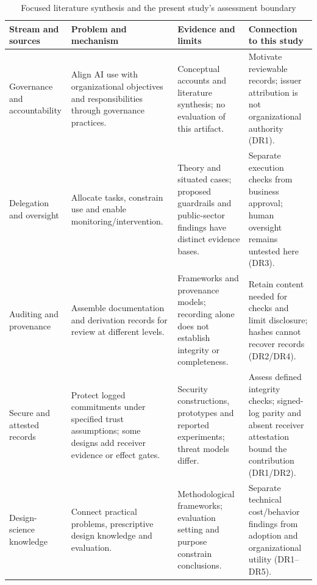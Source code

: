 \begin{table}[!htbp]
\centering
\caption{Focused literature synthesis and the present study's assessment boundary}
\label{tab:is-synthesis}
\begingroup\footnotesize{}\setlength{\tabcolsep}{4pt}
\begin{tabularx}{\textwidth}{@{}>{\raggedright\arraybackslash}p{29mm}>{\raggedright\arraybackslash}X>{\raggedright\arraybackslash}X>{\raggedright\arraybackslash}X@{}}
\toprule
Stream and sources & Problem and mechanism & Evidence and limits & Connection to this study \\
\midrule
Governance and accountability \citep{berente2021,mantymaki2022,papagiannidis2025} & Align AI use with organizational objectives and responsibilities through governance practices. & Conceptual accounts and literature synthesis; no evaluation of this artifact. & Motivate reviewable records; issuer attribution is not organizational authority (DR1). \\[5pt]
Delegation and oversight \citep{baird2021,asatiani2021,rintakahila2022,grisold2025} & Allocate tasks, constrain use and enable monitoring/intervention. & Theory and situated cases; proposed guardrails and public-sector findings have distinct evidence bases. & Separate execution checks from business approval; human oversight remains untested here (DR3). \\[5pt]
Auditing and provenance \citep{raji2020,mokander2023,moreau2011} & Assemble documentation and derivation records for review at different levels. & Frameworks and provenance models; recording alone does not establish integrity or completeness. & Retain content needed for checks and limit disclosure; hashes cannot recover records (DR2/DR4). \\[5pt]
Secure and attested records \citep{schneier1999,crosby2009,figuera2026sello,arslan2026janus} & Protect logged commitments under specified trust assumptions; some designs add receiver evidence or effect gates. & Security constructions, prototypes and reported experiments; threat models differ. & Assess defined integrity checks; signed-log parity and absent receiver attestation bound the contribution (DR1/DR2). \\[5pt]
Design-science knowledge \citep{gregor2013,venable2016} & Connect practical problems, prescriptive design knowledge and evaluation. & Methodological frameworks; evaluation setting and purpose constrain conclusions. & Separate technical cost/behavior findings from adoption and organizational utility (DR1--DR5). \\[5pt]

\end{tabularx}
\end{table}
